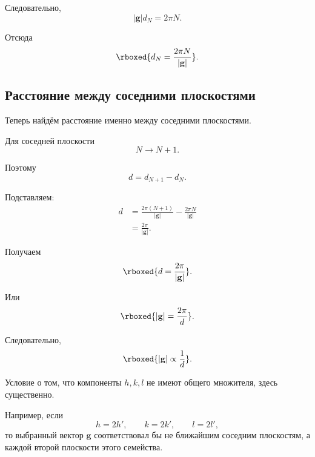\documentclass[../final.tex]{subfiles}
\begin{document}
Следовательно,
%
\begin{equation*}
    |\mathbf g|d_N
    =
    2\pi N.
\end{equation*}

Отсюда
%
\begin{equation*}
    \rboxed{
        d_N
        =
        \frac{2\pi N}{|\mathbf g|}
    }.
\end{equation*}



\subsection*{Расстояние между соседними плоскостями}

Теперь найдём расстояние именно между соседними плоскостями.

Для соседней плоскости
%
\begin{equation*}
    N\longrightarrow N+1.
\end{equation*}

Поэтому
%
\begin{equation*}
    d
    =
    d_{N+1}-d_N.
\end{equation*}

Подставляем:
%
\begin{align*}
    d
    &=
    \frac{2\pi(N+1)}{|\mathbf g|}
    -
    \frac{2\pi N}{|\mathbf g|}
    \\
    &=
    \frac{2\pi}{|\mathbf g|}.
\end{align*}

Получаем
%
\begin{equation*}
    \rboxed{
        d
        =
        \frac{2\pi}{|\mathbf g|}
    }.
\end{equation*}

Или
%
\begin{equation*}
    \rboxed{
        |\mathbf g|
        =
        \frac{2\pi}{d}
    }.
\end{equation*}

Следовательно,
%
\begin{equation*}
    \rboxed{
        |\mathbf g|
        \propto
        \frac{1}{d}
    }.
\end{equation*}

\remark[Комментарий.]
Условие о том, что компоненты $h,k,l$ не имеют общего
множителя, здесь существенно.

Например, если
%
\begin{equation*}
    h=2h',
    \qquad
    k=2k',
    \qquad
    l=2l',
\end{equation*}
%
то выбранный вектор $\mathbf g$ соответствовал бы не ближайшим
соседним плоскостям, а каждой второй плоскости этого семейства.
\end{document}
